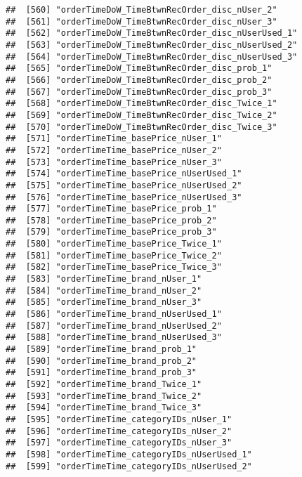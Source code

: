 \documentclass[10pt]{report}
\begin{document}
\begin{verbatim}
##  [560] "orderTimeDoW_TimeBtwnRecOrder_disc_nUser_2"           
##  [561] "orderTimeDoW_TimeBtwnRecOrder_disc_nUser_3"           
##  [562] "orderTimeDoW_TimeBtwnRecOrder_disc_nUserUsed_1"       
##  [563] "orderTimeDoW_TimeBtwnRecOrder_disc_nUserUsed_2"       
##  [564] "orderTimeDoW_TimeBtwnRecOrder_disc_nUserUsed_3"       
##  [565] "orderTimeDoW_TimeBtwnRecOrder_disc_prob_1"            
##  [566] "orderTimeDoW_TimeBtwnRecOrder_disc_prob_2"            
##  [567] "orderTimeDoW_TimeBtwnRecOrder_disc_prob_3"            
##  [568] "orderTimeDoW_TimeBtwnRecOrder_disc_Twice_1"           
##  [569] "orderTimeDoW_TimeBtwnRecOrder_disc_Twice_2"           
##  [570] "orderTimeDoW_TimeBtwnRecOrder_disc_Twice_3"           
##  [571] "orderTimeTime_basePrice_nUser_1"                      
##  [572] "orderTimeTime_basePrice_nUser_2"                      
##  [573] "orderTimeTime_basePrice_nUser_3"                      
##  [574] "orderTimeTime_basePrice_nUserUsed_1"                  
##  [575] "orderTimeTime_basePrice_nUserUsed_2"                  
##  [576] "orderTimeTime_basePrice_nUserUsed_3"                  
##  [577] "orderTimeTime_basePrice_prob_1"                       
##  [578] "orderTimeTime_basePrice_prob_2"                       
##  [579] "orderTimeTime_basePrice_prob_3"                       
##  [580] "orderTimeTime_basePrice_Twice_1"                      
##  [581] "orderTimeTime_basePrice_Twice_2"                      
##  [582] "orderTimeTime_basePrice_Twice_3"                      
##  [583] "orderTimeTime_brand_nUser_1"                          
##  [584] "orderTimeTime_brand_nUser_2"                          
##  [585] "orderTimeTime_brand_nUser_3"                          
##  [586] "orderTimeTime_brand_nUserUsed_1"                      
##  [587] "orderTimeTime_brand_nUserUsed_2"                      
##  [588] "orderTimeTime_brand_nUserUsed_3"                      
##  [589] "orderTimeTime_brand_prob_1"                           
##  [590] "orderTimeTime_brand_prob_2"                           
##  [591] "orderTimeTime_brand_prob_3"                           
##  [592] "orderTimeTime_brand_Twice_1"                          
##  [593] "orderTimeTime_brand_Twice_2"                          
##  [594] "orderTimeTime_brand_Twice_3"                          
##  [595] "orderTimeTime_categoryIDs_nUser_1"                    
##  [596] "orderTimeTime_categoryIDs_nUser_2"                    
##  [597] "orderTimeTime_categoryIDs_nUser_3"                    
##  [598] "orderTimeTime_categoryIDs_nUserUsed_1"                
##  [599] "orderTimeTime_categoryIDs_nUserUsed_2"                

\end{verbatim}
\end{document}
